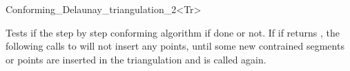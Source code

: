 \begin{ccRefClass}{Conforming_Delaunay_triangulation_2<Tr>}
\begin{ccAdvanced}
\ccGlue
{}

{ Tests if the step by step conforming algorithm if done or not. If if
  returns , the following calls to
   will not insert any points, until some
  new contrained segments or points are inserted in the triangulation and
   is called again. }

\end{ccAdvanced}

\end{ccRefClass}

